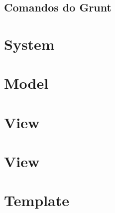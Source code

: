         \subsection{Comandos do Grunt\label{sub:comandos-grunt}}

    \section{System\label{sec:estrutura-pastas}}

    \section{Model\label{sec:estrutura-pastas}}

    \section{View\label{sec:estrutura-pastas}}

    \section{View\label{sec:estrutura-pastas}}

    \section{Template\label{sec:estrutura-pastas}}

